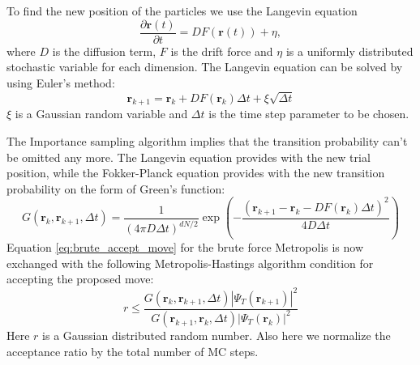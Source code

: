 \documentclass[12pt,a4paper,english]{article}
\begin{document}
To find the new position of the particles we use the Langevin equation
\begin{equation}
\label{eq:Langevin}
\frac{\partial \textbf{r}(t)}{\partial t}=DF(\textbf{r}(t))+\eta,
\end{equation}
where $D$ is the diffusion term, $F$ is the drift force and $\eta$ is a uniformly distributed stochastic variable for each dimension. The Langevin equation can be solved by using Euler's method:
\begin{equation}
\label{eq:Langevin_Euler}
\textbf{r}_{k+1}=\textbf{r}_k+DF(\textbf{r}_k)\Delta t+\xi\sqrt{\Delta t}
\end{equation}
$\xi$ is a Gaussian random variable and $\Delta t$ is the time step parameter to be chosen.

The Importance sampling algorithm implies that the transition probability can't be omitted any more. The Langevin equation provides with the new trial position, while the Fokker-Planck equation provides with the new transition probability on the form of Green's function:
\begin{equation}
\label{eq:Green}
G(\textbf{r}_k,\textbf{r}_{k+1},\Delta t)=\frac{1}{(4\pi D\Delta t)^{dN/2}}\exp\left(-\frac{(\textbf{r}_{k+1}-\textbf{r}_{k}-DF(\textbf{r}_k)\Delta t)^2}{4D\Delta t}\right)
\end{equation}
Equation \ref{eq:brute_accept_move} for the brute force Metropolis is now exchanged with the following Metropolis-Hastings algorithm condition for accepting the proposed move:
\begin{equation}
\label{eq:importance_accept_move}
r\leq\frac{G(\textbf{r}_k,\textbf{r}_{k+1},\Delta t)|\Psi_T(\textbf{r}_{k+1})|^2}{G(\textbf{r}_{k+1},\textbf{r}_{k},\Delta t)|\Psi_T(\textbf{r}_k)|^2}
\end{equation}
Here $r$ is a Gaussian distributed random number. Also here we normalize the acceptance ratio by the total number of MC steps.
\end{document}
